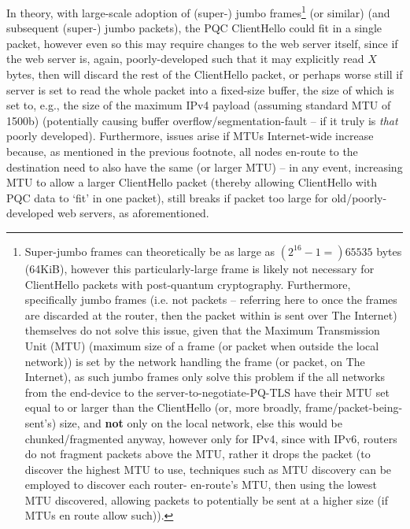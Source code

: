 In theory, with large-scale adoption of (super-) jumbo frames\footnote{Super-jumbo frames can theoretically be as large as $(2^{16}-1 =) 65535$ bytes (64KiB), however this particularly-large frame is likely not necessary for ClientHello packets with post-quantum cryptography. Furthermore, specifically jumbo frames (i.e. not packets -- referring here to once the frames are discarded at the router, then the packet within is sent over The Internet) themselves do not solve this issue, given that the Maximum Transmission Unit (MTU) (maximum size of a frame (or packet when outside the local network)) is set by the network handling the frame (or packet, on The Internet), as such jumbo frames only solve this problem if the all networks from the end-device to the server-to-negotiate-PQ-TLS have their MTU set equal to or larger than the ClientHello (or, more broadly, frame/packet-being-sent's) size, and \textbf{not} only on the local network, else this would be chunked/fragmented anyway, however only for IPv4, since with IPv6, routers do not fragment packets above the MTU, rather it drops the packet (to discover the highest MTU to use, techniques such as MTU discovery can be employed to discover each router- en-route's MTU, then using the lowest MTU discovered, allowing packets to potentially be sent at a higher size (if MTUs en route allow such)).} (or similar) (and subsequent (super-) jumbo packets), the PQC ClientHello could fit in a single packet, however even so this may require changes to the web server itself, since if the web server is, again, poorly-developed such that it may explicitly read $X$ bytes, then will discard the rest of the ClientHello packet, or perhaps worse still if server is set to read the whole packet into a fixed-size buffer, the size of which is set to, e.g., the size of the maximum IPv4 payload (assuming standard MTU of 1500b) (potentially causing buffer overflow/segmentation-fault -- if it truly is \textit{that} poorly developed). Furthermore, issues arise if MTUs Internet-wide increase because, as mentioned in the previous footnote, all nodes en-route to the destination need to also have the same (or larger MTU) -- in any event, increasing MTU to allow a larger ClientHello packet (thereby allowing ClientHello with PQC data to `fit' in one packet), still breaks if packet too large for old/poorly-developed web servers, as aforementioned.\\
